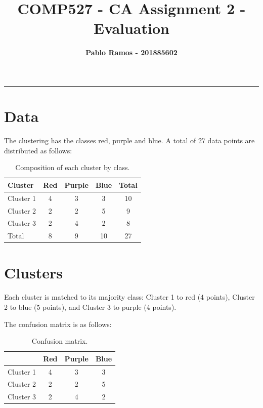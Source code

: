\documentclass[11pt]{article}
\title{\textcolor{Bittersweet}{\textbf{COMP527 - CA Assignment 2 - Evaluation}}}
\author{\textbf{Pablo Ramos - 201885602}}
\begin{document}
\maketitle
{\setlength\parindent{0mm} {\color{Bittersweet} \rule{\linewidth}{0.5mm}}}

\section*{Data}

The clustering has the classes red, purple and blue. A total of 27 data points are distributed as follows:

\begin{table}[H]
\centering
\begin{tabular}{lccc|c}
\toprule
\textbf{Cluster} & \textbf{Red} & \textbf{Purple} & \textbf{Blue} & \textbf{Total} \\
\midrule
Cluster 1 & 4 & 3 & 3 & 10 \\
Cluster 2 & 2 & 2 & 5 & 9  \\
Cluster 3 & 2 & 4 & 2 & 8  \\
\midrule
Total     & 8 & 9 & 10 & 27 \\
\bottomrule
\end{tabular}
\caption{Composition of each cluster by class.}
\label{tab:composition}
\end{table}

\section*{Clusters}

Each cluster is matched to its majority class: Cluster 1 to red (4 points), Cluster 2 to blue (5 points), and Cluster 3 to purple (4 points). 

\bigskip

The confusion matrix is as follows:

\begin{table}[H]
\centering
\begin{tabular}{lccc}
\toprule
 & \textbf{Red} & \textbf{Purple} & \textbf{Blue} \\
\midrule
Cluster 1 & 4 & 3 & 3 \\
Cluster 2 & 2 & 2 & 5 \\
Cluster 3 & 2 & 4 & 2 \\
\bottomrule
\end{tabular}
\caption{Confusion matrix.}
\label{tab:confusion}
\end{table}
\end{document}

